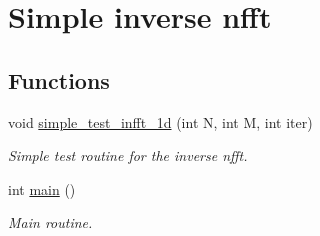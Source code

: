 \hypertarget{group__examples__solver__simple}{
\section{Simple inverse nfft}
\label{group__examples__solver__simple}
}
\subsection*{Functions}
\begin{CompactItemize}
\item 
\hypertarget{group__examples__solver__simple_ga0}{
void \hyperlink{group__examples__solver__simple_ga0}{simple\_\-test\_\-infft\_\-1d} (int N, int M, int iter)}
\label{group__examples__solver__simple_ga0}

\begin{CompactList}\small\item\em Simple test routine for the inverse nfft. \item\end{CompactList}\item 
\hypertarget{group__examples__solver__simple_ga1}{
int \hyperlink{group__examples__solver__simple_ga1}{main} ()}
\label{group__examples__solver__simple_ga1}

\begin{CompactList}\small\item\em Main routine. \item\end{CompactList}\end{CompactItemize}
